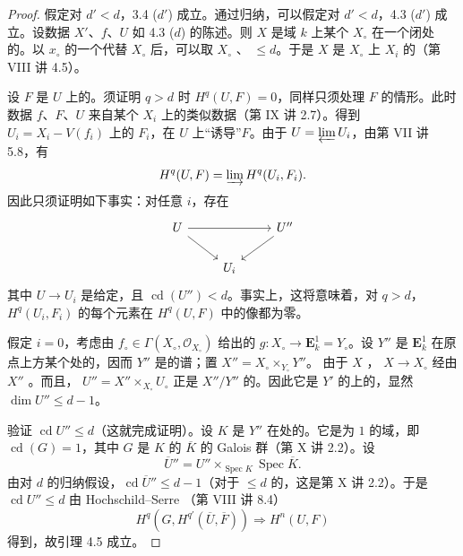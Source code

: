 \begin{proof}
假定对 $d'<d$，3.4 ($d'$) 成立。通过归纳，可以假定对 $d'<d$，4.3 ($d'$) 成立。设数据 $X'$、$f$、$U$ 如 4.3 ($d$) 的陈述。则 $X$ 是域 $k$ 上某个 $X_\circ$ 在一个闭处的。以 $x_\circ$ 的一个代替 $X_\circ$ 后，可以取 $X_\circ$ 、 $\leq d$。于是 $X$ 是 $X_\circ$ 上 $X_i$ 的（第 VIII 讲 4.5）。

设 $F$ 是 $U$ 上的。须证明 $q>d$ 时 $H^q(U,F)=0$，同样只须处理 $F$ 的情形。此时数据 $f$、$F$、$U$ 来自某个 $X_i$ 上的类似数据（第 IX 讲 2.7）。得到 $U_i=X_i-V(f_i)$ 上的 $F_i$，在 $U$ 上“诱导”$F$。由于 $U=\varprojlim U_i$，由第 VII 讲 5.8，有
\[
H^q(U,F)=\varinjlim H^q(U_i,F_i).
\]
因此只须证明如下事实：对任意 $i$，存在
\[
\begin{tikzcd}
U\arrow[rr]\arrow[dr]&&U''\arrow[dl]\\
&U_i&
\end{tikzcd}
\]
其中 $U\to U_i$ 是给定，且 $\operatorname{cd}(U'')<d$。事实上，这将意味着，对 $q>d$，$H^q(U_i,F_i)$ 的每个元素在 $H^q(U,F)$ 中的像都为零。

假定 $i=0$，考虑由 $f_\circ\in\Gamma(X_\circ,\mathcal O_{X_\circ})$ 给出的 $g:X_\circ\to\mathbf E_k^1=Y_\circ$。设 $Y''$ 是 $\mathbf E_k^1$ 在原点上方某个处的，因而 $Y''$ 是的谱；置 $X''=X_\circ\times_{Y_\circ}Y''$。
由于 $X$ ， $X\to X_\circ$ 经由 $X''$ 。而且， $U''=X''\times_{X_\circ}U_\circ$ 正是 $X''/Y''$ 的。因此它是 $Y'$ 的上的，显然 $\dim U''\leq d-1$。

验证 $\operatorname{cd}U''\leq d$（这就完成证明）。设 $K$ 是 $Y''$ 在处的。它是为 $1$ 的域，即 $\operatorname{cd}(G)=1$，其中 $G$ 是 $K$ 的 $\overline K$ 的 Galois 群（第 X 讲 2.2）。设
\[
\overline U''=U''\times_{\operatorname{Spec}K}\operatorname{Spec}\overline K.
\]
由对 $d$ 的归纳假设，$\operatorname{cd}\overline U''\leq d-1$（对于 $\leq d$ 的，这是第 X 讲 2.2）。于是 $\operatorname{cd}U''\leq d$ 由 Hochschild--Serre （第 VIII 讲 8.4）
\[
H^q(G,H^{q'}(\overline U,\overline F))\Longrightarrow H^n(U,F)
\]
得到，故引理 4.5 成立。
\end{proof}
